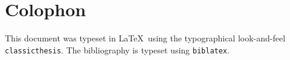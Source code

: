 \pagestyle{empty}

\hfill

\vfill


\section*{Colophon}
This document was typeset in \LaTeX~using the typographical look-and-feel
\texttt{classicthesis}. The bibliography is typeset using \texttt{biblatex}.
